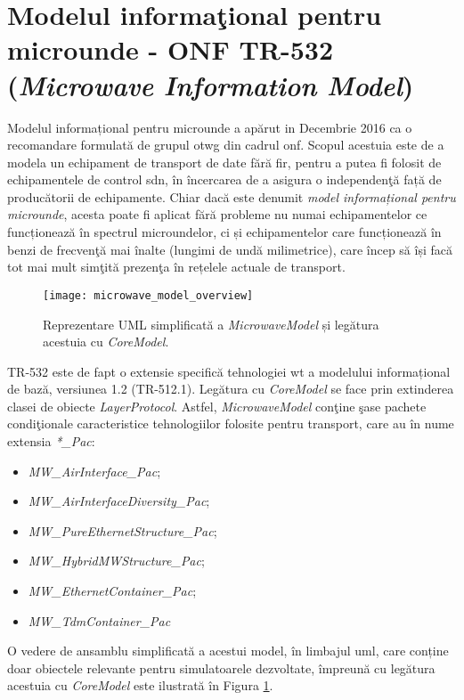 \section{Modelul informaţional pentru microunde - ONF TR-532 (\textit{Microwave Information Model})}

Modelul informațional pentru microunde \cite{onftr532} a apărut in Decembrie 2016 ca o recomandare formulată de grupul \gls{otwg} din cadrul \gls{onf}. Scopul acestuia este de a modela un echipament de transport de date fără fir, pentru a putea fi folosit de echipamentele de control \gls{sdn}, în încercarea de a asigura o independenţă față de producătorii de echipamente. Chiar dacă este denumit \textit{model informațional pentru microunde}, acesta poate fi aplicat fără probleme nu numai echipamentelor ce funcționează în spectrul microundelor, ci și echipamentelor care funcționează în benzi de frecvenţă mai înalte (lungimi de undă milimetrice), care încep să își facă tot mai mult simţită prezenţa în rețelele actuale de transport.

\begin{figure}[t]
	\centering
	\texttt{[image: microwave\_model\_overview]}
	\caption{Reprezentare UML simplificată a \textit{MicrowaveModel} și legătura acestuia cu \textit{CoreModel}.}
	\label{fig:microwave_model}
\end{figure}

TR-532 este de fapt o extensie specifică tehnologiei \gls{wt} a modelului informațional de bază, versiunea 1.2 (TR-512.1). Legătura cu \textit{CoreModel} se face prin extinderea clasei de obiecte \textit{LayerProtocol}. Astfel, \textit{MicrowaveModel} conţine şase pachete condiţionale caracteristice tehnologiilor folosite pentru transport, care au în nume extensia \textit{*\_Pac}: 

\begin{itemize}
	\item \textit{MW\_AirInterface\_Pac};
	\item \textit{MW\_AirInterfaceDiversity\_Pac};
	\item \textit{MW\_PureEthernetStructure\_Pac};
	\item \textit{MW\_HybridMWStructure\_Pac};
	\item \textit{MW\_EthernetContainer\_Pac};
	\item \textit{MW\_TdmContainer\_Pac}
\end{itemize}

O vedere de ansamblu simplificată a acestui model, în limbajul \gls{uml}, care conține doar obiectele relevante pentru simulatoarele dezvoltate, împreună cu legătura acestuia cu \textit{CoreModel} este ilustrată în Figura \ref{fig:microwave_model}.


